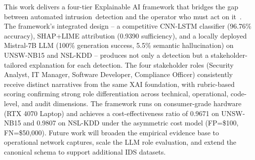 \documentclass[sensors,apajournal,article,submit,moreauthors]{Definitions/mdpi}
\begin{document}
This work delivers a four-tier Explainable AI framework that bridges the gap between automated \mbox{intrusion detection} and the operator who must act on it~\citep{apruzzese2020deep,vinayakumar2019deep}. The framework's integrated design -- a competitive CNN-LSTM classifier (96.76\% accuracy), SHAP+LIME attribution (0.9390 sufficiency), and a locally deployed Mistral-7B LLM (100\% generation success, 5.5\% semantic hallucination) on UNSW-NB15 and NSL-KDD -- produces not only a detection but a \mbox{stakeholder-tailored} explanation for each detection. The four stakeholder roles (Security Analyst, IT Manager, Software Developer, Compliance Officer) consistently receive distinct narratives from the same XAI foundation, with rubric-based scoring confirming strong role differentiation across technical, operational, code-level, and audit dimensions. The framework runs on \mbox{consumer-grade} hardware (RTX 4070 Laptop) and achieves a \mbox{cost-effective}ness ratio of 0.9671 on UNSW-NB15 and 0.9807 on NSL-KDD under the asymmetric cost model (FP=\$100, FN=\$50{,}000). Future work will broaden the empirical evidence base to operational network captures, scale the LLM role evaluation, and extend the canonical schema to support additional IDS datasets.



\end{document}
